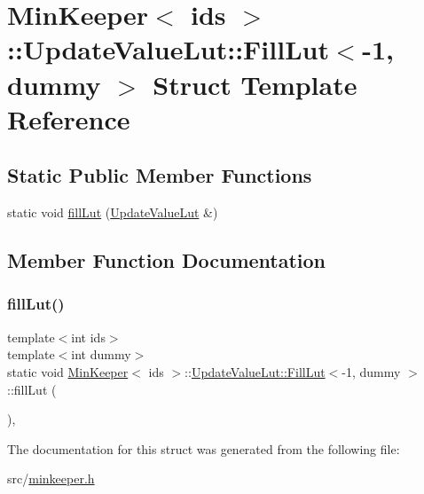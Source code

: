 \hypertarget{structMinKeeper_1_1UpdateValueLut_1_1FillLut_3-1_00_01dummy_01_4}{}\section{Min\+Keeper$<$ ids $>$\+:\+:Update\+Value\+Lut\+:\+:Fill\+Lut$<$-\/1, dummy $>$ Struct Template Reference}
\label{structMinKeeper_1_1UpdateValueLut_1_1FillLut_3-1_00_01dummy_01_4}
\subsection*{Static Public Member Functions}
\begin{DoxyCompactItemize}
\item 
static void \hyperlink{structMinKeeper_1_1UpdateValueLut_1_1FillLut_3-1_00_01dummy_01_4_aa2d4197c7848fd7b6f3e44e755df30d6}{fill\+Lut} (\hyperlink{classMinKeeper_1_1UpdateValueLut}{Update\+Value\+Lut} \&)
\end{DoxyCompactItemize}


\subsection{Member Function Documentation}
\mbox{\label{structMinKeeper_1_1UpdateValueLut_1_1FillLut_3-1_00_01dummy_01_4_aa2d4197c7848fd7b6f3e44e755df30d6}} 
\subsubsection{\texorpdfstring{fill\+Lut()}{fillLut()}}
{\footnotesize\ttfamily template$<$int ids$>$ \\
template$<$int dummy$>$ \\
static void \hyperlink{classMinKeeper}{Min\+Keeper}$<$ ids $>$\+::\hyperlink{structMinKeeper_1_1UpdateValueLut_1_1FillLut}{Update\+Value\+Lut\+::\+Fill\+Lut}$<$-\/1, dummy $>$\+::fill\+Lut (\begin{DoxyParamCaption}\item[{\hyperlink{classMinKeeper_1_1UpdateValueLut}{Update\+Value\+Lut} \&}]{ }\end{DoxyParamCaption})\hspace{0.3cm}{\ttfamily [inline]}, {\ttfamily [static]}}



The documentation for this struct was generated from the following file\+:\begin{DoxyCompactItemize}
\item 
src/\hyperlink{minkeeper_8h}{minkeeper.\+h}\end{DoxyCompactItemize}
